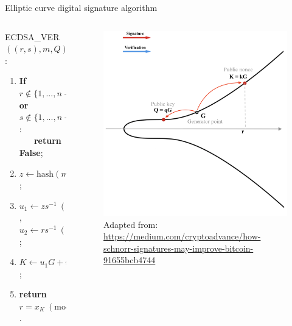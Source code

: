 \documentclass[slidescentered]{beamer}
\newcommand{\source}[1]{\caption*{\tiny Adapted from: {#1}} }
\begin{document}
	\begin{frame}{Elliptic curve digital signature algorithm}
		\begin{columns}
			\begin{column}{0.6\linewidth}
				ECDSA\_VER$((r,s), m, Q)$:
				\begin{enumerate}
					\item<2 -> \textbf{If} $r \notin \{1, ..., n - 1\}$ \textbf{or} $s \notin \{1, ..., n - 1\}$: \\ \textbf{\ \ \ return False};
					\item<3 -> $z \gets \text{hash}(m)$;
					\item<4 -> $u_1 \gets zs^{-1} \ (\text{mod} \ n)$, $u_2 \gets rs^{-1} \ (\text{mod} \ n)$;
					\item<5 -> $K \gets u_1G + u_2Q$;
					\item<7 -> \textbf{return $r = x_K \ (\text{mod} \ n)$}.
				\end{enumerate}
			\end{column}
			\begin{column}{0.5\linewidth}
				\begin{figure}
					 {\vspace*{-0.7cm}
						\hspace*{-1.7cm}
						\includegraphics[scale=0.29]{images/ECDSA4}
						\source{\tiny \url{https://medium.com/cryptoadvance/how-schnorr-signatures-may-improve-bitcoin-91655bcb4744}}}

\end{figure}
\end{column}
\end{columns}
\end{frame}
\end{document}

